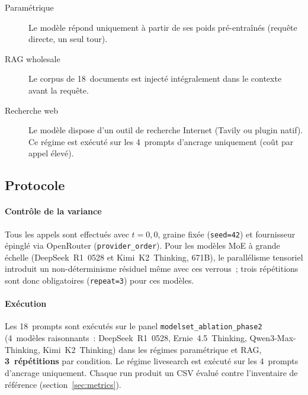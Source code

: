 \begin{description}
\item[Paramétrique] Le modèle répond uniquement à partir de ses poids
  pré-entraînés (requête directe, un seul tour).
\item[RAG wholesale] Le corpus de 18~documents est injecté intégralement
  dans le contexte avant la requête.
\item[Recherche web] Le modèle dispose d'un outil de recherche Internet
  (Tavily ou plugin natif). Ce régime est exécuté sur les 4~prompts
  d'ancrage uniquement (coût par appel élevé).
\end{description}

\subsection{Protocole}\label{sec:protocole-ablation}

\paragraph{Contrôle de la variance}

Tous les appels sont effectués avec $t{=}0{,}0$, graine fixée (\texttt{seed=42})
et fournisseur épinglé via OpenRouter (\texttt{provider\_order}). Pour les
modèles MoE à grande échelle (DeepSeek~R1~0528 et Kimi~K2~Thinking, 671B),
le parallélisme tensoriel introduit un non-déterminisme résiduel même avec
ces verrous~; trois répétitions sont donc obligatoires (\texttt{repeat=3})
pour ces modèles.

\paragraph{Exécution}

Les 18~prompts sont exécutés sur le panel \texttt{modelset\_ablation\_phase2}
(4~modèles raisonnants~: DeepSeek~R1~0528, Ernie~4.5~Thinking,
Qwen3-Max-Thinking, Kimi~K2~Thinking) dans les régimes paramétrique et RAG,
\textbf{3~répétitions} par condition. Le régime livesearch est exécuté sur
les 4~prompts d'ancrage uniquement. Chaque run produit un CSV évalué contre
l'inventaire de référence (section~\ref{sec:metrics}).

